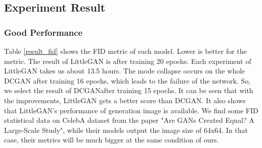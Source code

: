 \subsection{Experiment Result}
\subsubsection*{Good Performance}
Table \ref{result_fid} shows the FID metric of each model.
Lower is better for the metric.
The result of LittleGAN is after training 20 epochs.
Each experiment of LittleGAN takes us about 13.5 hours.
The mode collapse occurs on the whole DCGAN after training 16 epochs,
    which leads to the failure of the network.
    So, we select the result of DCGANafter training 15 epochs.
It can be seen that with the improvements,
    LittleGAN gets a better score than DCGAN.
    It also shows that LittleGAN's performance of generation image is available.
We find some FID statistical data on CelebA dataset from the paper "Are GANs Created Equal? A Large-Scale Study",
    while their models output the image size of 64x64.
In that case, their metrics will be much bigger at the same condition of ours.

